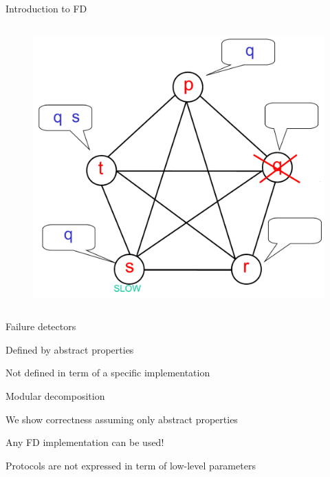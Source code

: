 \begin{frame}{Introduction to FD}
\begin{overprint}
\begin{columns}[t]
\begin{column}{0.35\textwidth}
\begin{figure}
\includegraphics[width=\textwidth]{figs/07/fd}
\end{figure}

\end{column}
\end{columns}

\end{overprint}
\end{frame}

% 
% 
% 



\begin{frame}{Failure detectors}


\BIL
\item Defined by abstract properties
\BI
\item Not defined in term of a specific implementation
\EI
\item Modular decomposition
\BI
\item We show correctness assuming only abstract properties
\item Any FD implementation can be used!
\item Protocols are not expressed in term of low-level parameters
\EI
\EIL

\end{frame}

